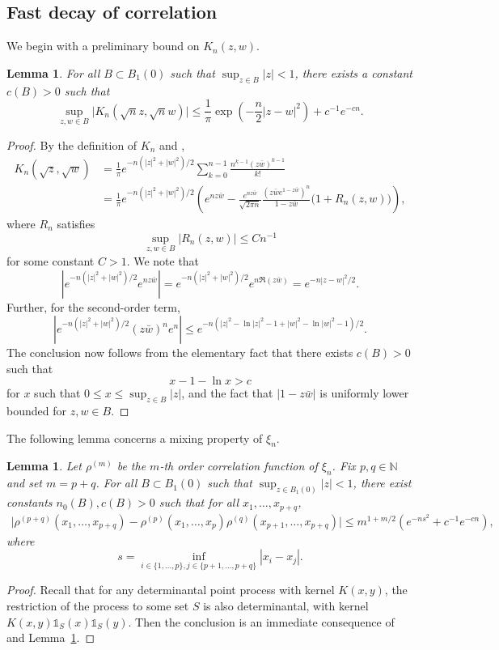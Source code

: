 \documentclass{amsart}
\theoremstyle{plain}
\newtheorem{lemma}[theorem]{Lemma}
\theoremstyle{definition}
\theoremstyle{remark}
\def\one{\mathds1}
\begin{document}
\subsection{Fast decay of correlation}
We begin with a preliminary bound on $K_n(z,w)$. 
\begin{lemma}\label{l:Kbound}
For all $B \subset B_1(0)$ such that $\sup_{z \in B} | z | <1$, there exists a constant $c(B)>0$ such that 
\[
\sup_{z,w \in B}
\big| K_n(\sqrt{n} z, \sqrt{n} w ) \big|
\le \frac{1}{\pi} \exp\left( - \frac{n}{2} |z-w|^2 \right) + c^{-1} e^{-cn}.
\]
\end{lemma}
\begin{proof}
By the definition of $K_n$ and \cite[Lemma 4.1]{goel2024central},
\begin{align*}
K_n(\sqrt{z},\sqrt{w})
&=
\frac{1}{\pi} e^{- n(|z|^2 + |w|^2)/2}\sum_{k=0}^{n-1} \frac{ n^{k-1} (z\bar w)^{k-1}}{k!}\\
& =\frac{1}{\pi} e^{- n(|z|^2 + |w|^2)/2} \left( e^{n z\bar w}   - \frac{ e^{ n z\bar w} }{\sqrt{2 \pi n}} \frac{(z \bar w e^{1-z\bar w })^n }{1-z\bar w } \big( 1 + R_n(z,w ) \big) \right),
\end{align*}
where $R_n$ satisfies 
\[
\sup_{z,w \in B} \big|  R_n(z,w) \big| \le C n^{-1}
\]
for some constant $C>1$. 
We note that 
\[
|e^{- n(|z|^2 + |w|^2)/2}  e^{n z\bar w}| = e^{- n(|z|^2 + |w|^2)/2}  e^{n \Re( z\bar w)}  = e^{ - n |z -w|^2/2}.
\]
Further, for the second-order term,
\[
|e^{- n(|z|^2 + |w|^2)/2} (z \bar w)^n e^n | \le e^{- n(|z|^2 -  \ln |z|^2 - 1 + |w|^2 - \ln |w|^2  -1  )/2  }.
\]
The conclusion now follows from the elementary fact that there exists $c(B) > 0$ such that 
\[
x - 1  - \ln x > c 
\]
for $x$ such that $0 \le x \le \sup_{z \in B} |z|$, and the fact that $|1-z\bar w|$ is uniformly lower bounded for $z,w \in B$. 
\end{proof}


The following lemma concerns a mixing property of $\xi_n$. 
\begin{lemma}\label{l:lemma5}
Let $\rho^{(m)}$ be the $m$-th order correlation function of $\xi_n$. Fix $p, q \in \mathbb{N}$ and set $m= p+q$. 
For all $B \subset B_1(0)$ such that $\sup_{ z \in B_1(0)} | z | <1$, there exist constants $n_0(B), c(B)>0$ such that for all $x_1, \dots  , x_{p+q}$, 
\begin{align}
\big|\rho^{(p+q)}(x_1,\dots,x_{p+q})- \rho^{(p)}(x_1,\dots,x_p)\rho^{(q)}(x_{p+1},\dots,x_{p+q}) \big|\le  m^{1+m/2}  \left( e^{- ns^2} + c^{-1} e^{-cn} \right)  ,\label{eq:rhodec}
\end{align}
where  
\[ s=\inf_{i \in \{1,\dots,p\}, j \in \{p+1,\dots,p+q\}} |x_i-x_j|.
\]
\end{lemma}
\begin{proof}
Recall that for any determinantal point process with kernel $K(x,y)$, the restriction of the process to some set $S$ is also determinantal, with kernel $K(x,y) \one_S(x) \one_S(y)$. 
Then the conclusion is an immediate consequence of \cite[(3.4.5)]{AGZ10} and Lemma~\ref{l:Kbound}.
\end{proof}
\end{document}

